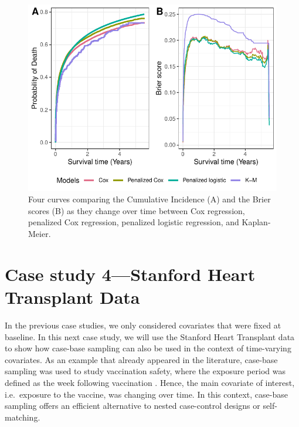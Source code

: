 \documentclass[
]{jss}
\begin{document}
\begin{CodeChunk}
\begin{figure}

{\centering \includegraphics{../figures/riskregressionBrier-1} 

}

\caption{\label{fig:cs3FinalBrier} Four curves comparing the Cumulative Incidence (A) and the Brier scores (B) as they change over time between Cox regression, penalized Cox regression, penalized logistic regression, and Kaplan-Meier.}\label{fig:riskregressionBrier}
\end{figure}
\end{CodeChunk}

\hypertarget{case-study-4stanford-heart-transplant-data}{%
\section{Case study 4---Stanford Heart Transplant
Data}\label{case-study-4stanford-heart-transplant-data}}

In the previous case studies, we only considered covariates that were
fixed at baseline. In this next case study, we will use the Stanford
Heart Transplant data
\citep[\citet{crowley1977covariance}]{clark1971cardiac} to show how
case-base sampling can also be used in the context of time-varying
covariates. As an example that already appeared in the literature,
case-base sampling was used to study vaccination safety, where the
exposure period was defined as the week following vaccination
\citep{saarela2015case}. Hence, the main covariate of interest,
i.e.~exposure to the vaccine, was changing over time. In this context,
case-base sampling offers an efficient alternative to nested
case-control designs or self-matching.
\end{document}
